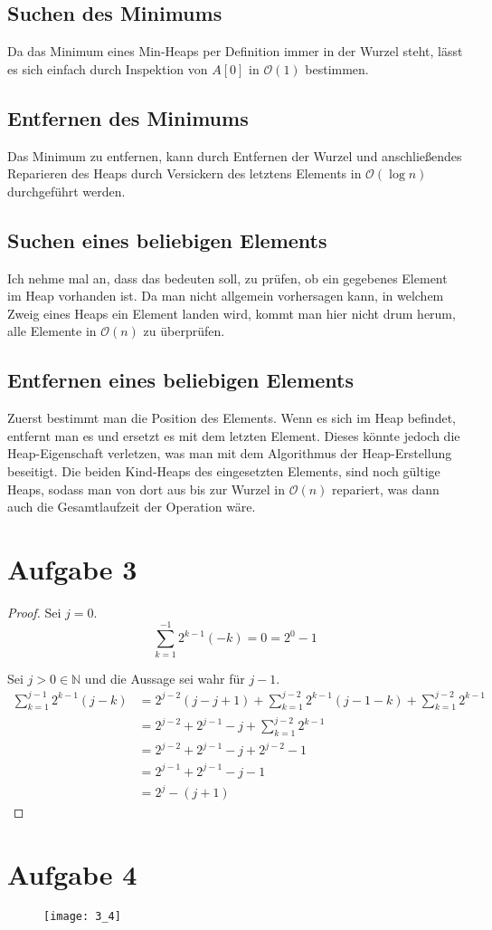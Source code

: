 \documentclass[10pt,a4paper]{article}
\begin{document}
\subsection{Suchen des Minimums}
Da das Minimum eines Min-Heaps per Definition immer in der Wurzel steht, lässt es sich einfach durch Inspektion von $A[0]$ in $\mathcal{O}(1)$ bestimmen.

\subsection{Entfernen des Minimums}
Das Minimum zu entfernen, kann durch Entfernen der Wurzel und anschließendes Reparieren des Heaps durch Versickern des letztens Elements in $\mathcal{O}(\log n)$ durchgeführt werden.

\subsection{Suchen eines beliebigen Elements}
Ich nehme mal an, dass das bedeuten soll, zu prüfen, ob ein gegebenes Element im Heap vorhanden ist.
Da man nicht allgemein vorhersagen kann, in welchem Zweig eines Heaps ein Element landen wird, kommt man hier nicht drum herum, alle Elemente in $\mathcal{O}(n)$ zu überprüfen.

\subsection{Entfernen eines beliebigen Elements}
Zuerst bestimmt man die Position des Elements.
Wenn es sich im Heap befindet, entfernt man es und ersetzt es mit dem letzten Element.
Dieses könnte jedoch die Heap-Eigenschaft verletzen, was man mit dem Algorithmus der Heap-Erstellung beseitigt.
Die beiden Kind-Heaps des eingesetzten Elements, sind noch gültige Heaps, sodass man von dort aus bis zur Wurzel in $\mathcal{O}(n)$ repariert, was dann auch die Gesamtlaufzeit der Operation wäre.

\section{Aufgabe 3}
\begin{proof}
  Sei $j = 0$.
  \begin{equation}
    \sum_{k = 1}^{-1} 2^{k - 1} (-k) = 0 = 2^{0} - 1
  \end{equation}
  
  Sei $j > 0 \in \mathbb{N}$ und die Aussage sei wahr für $j - 1$.
  \begin{align*}
    \sum_{k = 1}^{j - 1} 2^{k - 1} (j - k) & = 2^{j - 2} (j - j + 1) + \sum_{k = 1}^{j - 2} 2^{k - 1} (j - 1 - k) + \sum_{k = 1}^{j - 2} 2^{k - 1}\\
    & = 2^{j - 2} + 2^{j - 1} - j + \sum_{k = 1}^{j - 2} 2^{k - 1}\\
    & = 2^{j - 2} + 2^{j - 1} - j + 2^{j - 2} - 1\\
    & = 2^{j - 1} + 2^{j - 1} - j - 1\\
    & = 2^{j} - (j + 1)
  \end{align*}
\end{proof}

\section{Aufgabe 4}

\begin{figure}[H]
  \texttt{[image: 3\_4]}
\end{figure}
\end{document}
